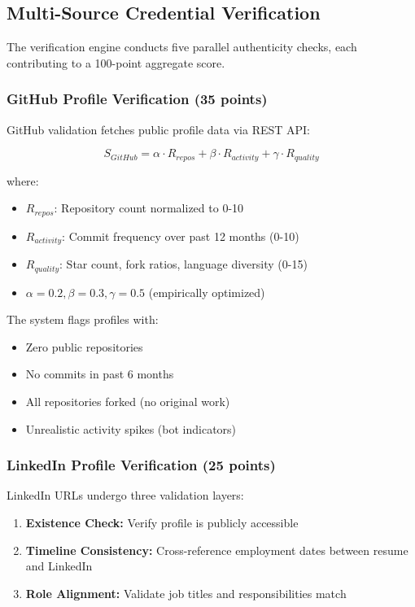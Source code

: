 \documentclass[conference]{IEEEtran}
\begin{document}
\subsection{Multi-Source Credential Verification}

The verification engine conducts five parallel authenticity checks, each contributing to a 100-point aggregate score.

\subsubsection{GitHub Profile Verification (35 points)}

GitHub validation fetches public profile data via REST API:

\begin{equation}
S_{GitHub} = \alpha \cdot R_{repos} + \beta \cdot R_{activity} + \gamma \cdot R_{quality}
\end{equation}

where:
\begin{itemize}
    \item $R_{repos}$: Repository count normalized to 0-10
    \item $R_{activity}$: Commit frequency over past 12 months (0-10)
    \item $R_{quality}$: Star count, fork ratios, language diversity (0-15)
    \item $\alpha = 0.2, \beta = 0.3, \gamma = 0.5$ (empirically optimized)
\end{itemize}

The system flags profiles with:
\begin{itemize}
    \item Zero public repositories
    \item No commits in past 6 months
    \item All repositories forked (no original work)
    \item Unrealistic activity spikes (bot indicators)
\end{itemize}

\subsubsection{LinkedIn Profile Verification (25 points)}

LinkedIn URLs undergo three validation layers:
\begin{enumerate}
    \item \textbf{Existence Check:} Verify profile is publicly accessible
    \item \textbf{Timeline Consistency:} Cross-reference employment dates between resume and LinkedIn
    \item \textbf{Role Alignment:} Validate job titles and responsibilities match
\end{enumerate}
\end{document}
